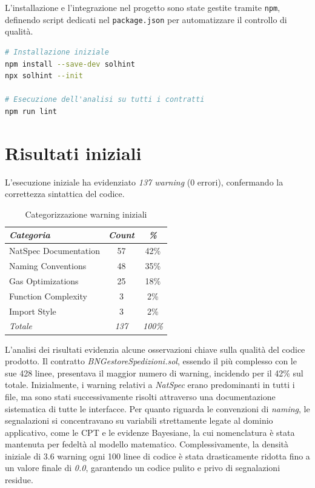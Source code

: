 L'installazione e l'integrazione nel progetto sono state gestite tramite \texttt{npm}, definendo script dedicati nel \texttt{package.json} per automatizzare il controllo di qualità.

\begin{lstlisting}[language=bash, caption={Workflow di utilizzo Solhint}]
# Installazione iniziale
npm install --save-dev solhint
npx solhint --init

# Esecuzione dell'analisi su tutti i contratti
npm run lint
\end{lstlisting}

\section{Risultati iniziali}

L'esecuzione iniziale ha evidenziato \textit{137 warning} (0 errori), confermando la correttezza sintattica del codice.

\begin{table}[H]
\centering
\caption{Categorizzazione warning iniziali}
\begin{tabular}{lcc}
\toprule
\textit{Categoria} & \textit{Count} & \textit{\%} \\
\midrule
NatSpec Documentation & 57 & 42\% \\
Naming Conventions & 48 & 35\% \\
Gas Optimizations & 25 & 18\% \\
Function Complexity & 3 & 2\% \\
Import Style & 3 & 2\% \\
\midrule
\textit{Totale} & \textit{137} & \textit{100\%} \\
\bottomrule
\end{tabular}
\end{table}

L'analisi dei risultati evidenzia alcune osservazioni chiave sulla qualità del codice prodotto. Il contratto \textit{BNGestoreSpedizioni.sol}, essendo il più complesso con le sue 428 linee, presentava il maggior numero di warning, incidendo per il 42\% sul totale. Inizialmente, i warning relativi a \textit{NatSpec} erano predominanti in tutti i file, ma sono stati successivamente risolti attraverso una documentazione sistematica di tutte le interfacce. Per quanto riguarda le convenzioni di \textit{naming}, le segnalazioni si concentravano su variabili strettamente legate al dominio applicativo, come le CPT e le evidenze Bayesiane, la cui nomenclatura è stata mantenuta per fedeltà al modello matematico. Complessivamente, la densità iniziale di 3.6 warning ogni 100 linee di codice è stata drasticamente ridotta fino a un valore finale di \textit{0.0}, garantendo un codice pulito e privo di segnalazioni residue.

